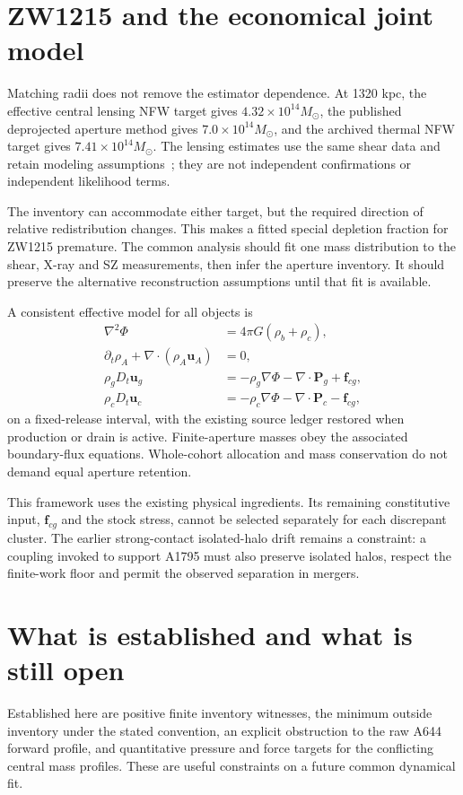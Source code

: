 \documentclass[11pt]{article}
\begin{document}
\clearpage
\section{ZW1215 and the economical joint model}
Matching radii does not remove the estimator dependence. At 1320 kpc, the effective central lensing NFW target gives $4.32\times10^{14}M_\odot$, the published deprojected aperture method gives $7.0\times10^{14}M_\odot$, and the archived thermal NFW target gives $7.41\times10^{14}M_\odot$. The lensing estimates use the same shear data and retain modeling assumptions~\cite{herbonnet}; they are not independent confirmations or independent likelihood terms.

The inventory can accommodate either target, but the required direction of relative redistribution changes. This makes a fitted special depletion fraction for ZW1215 premature. The common analysis should fit one mass distribution to the shear, X-ray and SZ measurements, then infer the aperture inventory. It should preserve the alternative reconstruction assumptions until that fit is available.

A consistent effective model for all objects is
\begin{align}
\nabla^2\Phi &=4\pi G(\rho_b+\rho_c),\\
\partial_t\rho_A+\nabla\cdot(\rho_A\mathbf u_A)&=0,\\
\rho_g D_t\mathbf u_g&=-\rho_g\nabla\Phi-\nabla\cdot\mathbf P_g+\mathbf f_{cg},\\
\rho_c D_t\mathbf u_c&=-\rho_c\nabla\Phi-\nabla\cdot\mathbf P_c-\mathbf f_{cg},
\end{align}
on a fixed-release interval, with the existing source ledger restored when production or drain is active. Finite-aperture masses obey the associated boundary-flux equations. Whole-cohort allocation and mass conservation do not demand equal aperture retention.

This framework uses the existing physical ingredients. Its remaining constitutive input, $\mathbf f_{cg}$ and the stock stress, cannot be selected separately for each discrepant cluster. The earlier strong-contact isolated-halo drift remains a constraint: a coupling invoked to support A1795 must also preserve isolated halos, respect the finite-work floor and permit the observed separation in mergers.

\section{What is established and what is still open}
Established here are positive finite inventory witnesses, the minimum outside inventory under the stated convention, an explicit obstruction to the raw A644 forward profile, and quantitative pressure and force targets for the conflicting central mass profiles. These are useful constraints on a future common dynamical fit.
\end{document}
